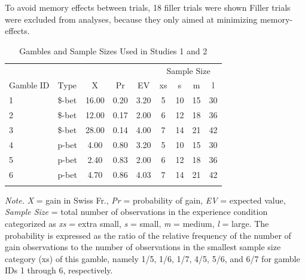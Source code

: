 \documentclass[a4paper, man, natbib, floatsintext]{apa6}
\begin{document}
To avoid memory effects between trials, 18 filler trials were shown Filler trials were excluded from analyses, because they only aimed at minimizing memory-effects.

\begin{table}[bth]
\begin{center}
\begin{threeparttable}
\caption{Gambles and Sample Sizes Used in Studies 1 and 2\label{table:Lotteries}}
\begin{tabular}{llccccccc}
\toprule
 &  &  &  &  & \multicolumn{4}{c}{Sample Size} \\
\cmidrule(r){6-9}
Gamble ID & Type & X & Pr & EV & xs & s & m & l\\
\midrule
1 & \$-bet & 16.00 & 0.20 & 3.20 & 5 & 10 & 15 & 30\\
2 & \$-bet & 12.00 & 0.17 & 2.00 & 6 & 12 & 18 & 36\\
3 & \$-bet & 28.00 & 0.14 & 4.00 & 7 & 14 & 21 & 42\\
4 & p-bet & 4.00 & 0.80 & 3.20 & 5 & 10 & 15 & 30\\
5 & p-bet & 2.40 & 0.83 & 2.00 & 6 & 12 & 18 & 36\\
6 & p-bet & 4.70 & 0.86 & 4.03 & 7 & 14 & 21 & 42\\
\bottomrule
\addlinespace
\end{tabular}
\begin{tablenotes}[para]
\normalsize{\textit{Note.} \textit{X} = gain in Swiss Fr., \textit{Pr} = probability of gain, \textit{EV} = expected value, \textit{Sample Size} = total number of observations in the experience condition categorized as \textit{xs} = extra small, \textit{s} = small, \textit{m} = medium, \textit{l} = large. The probability is expressed as the ratio of the relative frequency of the number of gain observations to the number of observations in the smallest sample size category (xs) of this gamble, namely 1/5, 1/6, 1/7, 4/5, 5/6, and 6/7 for gamble IDs 1 through 6, respectively.}
\end{tablenotes}
\end{threeparttable}
\end{center}
\end{table}
\end{document}
